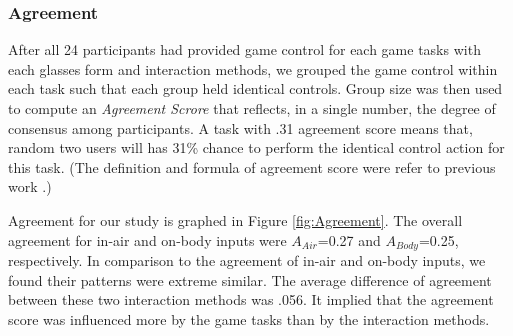 \documentclass{sigchi}
\begin{document}
   \subsubsection{Agreement}
   After all 24 participants had provided game control for each game tasks with each glasses form and interaction methods, we grouped the game control within each task such that each group held identical controls. Group size was then used to compute an \emph{Agreement Scrore} that reflects, in a single number, the degree of consensus among participants. A task with .31 agreement score means that, random two users will has 31\% chance to perform the identical control action for this task. (The definition and formula of agreement score were refer to previous work \cite{Wobbrock:2005:MGS:1056808.1057043}.)

   Agreement for our study is graphed in Figure \ref{fig:Agreement}. The overall agreement for in-air and on-body inputs were $A_{Air}$=0.27 and $A_{Body}$=0.25, respectively. In comparison to the agreement of in-air and on-body inputs, we found their patterns were extreme similar. The average difference of agreement between these two interaction methods was .056. It implied that the agreement score was influenced more by the game tasks than by the interaction methods.
\end{document}
